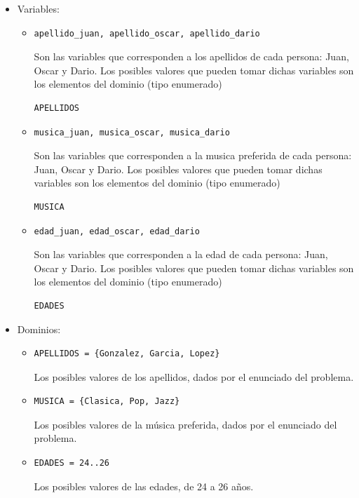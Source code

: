 \documentclass[12pt]{article}
\begin{document}
\begin{itemize}
\item Variables:
\begin{itemize}
\item \begin{verbatim}
apellido_juan, apellido_oscar, apellido_dario
\end{verbatim}
Son las variables que corresponden a los apellidos de cada persona: Juan, Oscar y Dario. Los posibles valores que pueden tomar dichas variables son los elementos del dominio (tipo enumerado) \begin{verbatim}
APELLIDOS
\end{verbatim}
\item \begin{verbatim}
musica_juan, musica_oscar, musica_dario
\end{verbatim}
Son las variables que corresponden a la musica preferida de cada persona: Juan, Oscar y Dario. Los posibles valores que pueden tomar dichas variables son los elementos del dominio (tipo enumerado) \begin{verbatim}
MUSICA
\end{verbatim}
\item \begin{verbatim}
edad_juan, edad_oscar, edad_dario
\end{verbatim}
Son las variables que corresponden a la edad de cada persona: Juan, Oscar y Dario. Los posibles valores que pueden tomar dichas variables son los elementos del dominio (tipo enumerado) \begin{verbatim}
EDADES
\end{verbatim}
\end{itemize}
\item Dominios:
\begin{itemize}
\item \begin{verbatim}
APELLIDOS = {Gonzalez, Garcia, Lopez}
\end{verbatim}
Los posibles valores de los apellidos, dados por el enunciado del problema.
\item \begin{verbatim}
MUSICA = {Clasica, Pop, Jazz}
\end{verbatim}
Los posibles valores de la música preferida, dados por el enunciado del problema.
\item \begin{verbatim}
EDADES = 24..26
\end{verbatim}
Los posibles valores de las edades, de 24 a 26 años.

\end{itemize}
\end{itemize}
\end{document}
